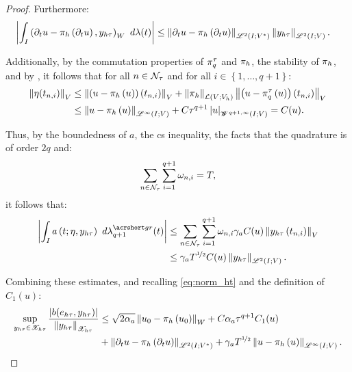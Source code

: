\begin{proof}
    Furthermore:
    \begin{align*}
        \left\lvert \int_I \left( \partial_t u - \pi_h \left( \partial_t u \right), y_{h \tau}\right)_W ~ d \lambda(t) \right\rvert &\leq \left\lVert  \partial_t u - \pi_h \left( \partial_t u \right)  \right\rVert_{\mathscr{L}^{2}(I; V^*)} \left\lVert  y_{h \tau}  \right\rVert_{\mathscr{L}^{2}(I; V)}.
    \end{align*}

    Additionally, by the commutation properties of $\pi^{\tau}_q$ and $\pi_h$, the stability of $\pi_h$, and by , it follows that for all $n \in \mathcal{N}_{\tau}$ and for all $i \in \left\{ 1, \dots, q + 1\right\}$:
    \begin{align*}
        \left\lVert  \eta(t_{n, i})  \right\rVert_V &\leq \left\lVert  \left( u - \pi_h \left( u \right) \right) \left( t_{n, i} \right)  \right\rVert_V + \left\lVert  \pi_h  \right\rVert_{\mathcal{L} \left(V; V_h \right)} \left\lVert  \left( u - \pi^{\tau}_q \left( u \right) \right) \left( t_{n, i} \right)  \right\rVert_V \\
        &\leq \left\lVert  u - \pi_h \left( u \right)  \right\rVert_{\mathscr{L}^{\infty}(I; V)} + C \tau^{q + 1} \left\lvert  u  \right\rvert_{\mathscr{W}^{q + 1, \infty}(I; V)} = C(u).
    \end{align*}

    Thus, by the boundedness of $a$, the \acrfull{cs} inequality, the facts that the quadrature is of order $2q$ and:
    \begin{align*}
        \sum_{n \in \mathcal{N}_{\tau}} \sum_{i = 1}^{q + 1} \omega_{n, i} = T,
    \end{align*}
    it follows that:
    \begin{align*}
        \left\lvert \int_I a \left( t; \eta, y_{h \tau}\right) ~ d \lambdaGR_{q + 1}(t) \right\rvert &\leq \sum_{n \in \TimeIndices} \sum_{i = 1}^{q + 1} \omega_{n, i} \ContC{a} C(u) \Norm{ y_{h \tau} \left( t_{n, i} \right)}_V \\
        &\leq \ContC{a} T^{\nicefrac12} C(u) \Norm{ y_{h \tau} }_{\SpaceLp{2}(I; V)}.
    \end{align*}

    Combining these estimates, and recalling \cref{eq:norm_ht} and the definition of $C_1(u)$:
    \begin{align*}
        \sup_{y_{h \tau} \in \mathscr{X}_{h \tau}} \frac{ \left\lvert b(e_{h \tau}, y_{h \tau}) \right\rvert }{\left\lVert y_{h \tau} \right\rVert_{\mathscr{X}_{h \tau}}} &\leq \sqrt{2 \alpha_{a}} \left\lVert  u_0 - \pi_h \left( u_0 \right)  \right\rVert_W + C \alpha_{a} \tau^{q + 1} C_1(u) \\
        &+ \left\lVert  \partial_t u - \pi_h \left( \partial_t u \right)  \right\rVert_{\mathscr{L}^{2}(I; V^*)} + \gamma_{a} T^{\nicefrac12} \left\lVert  u - \pi_h \left( u \right)  \right\rVert_{\mathscr{L}^{\infty}(I; V)}.
    \end{align*}


\end{proof}
